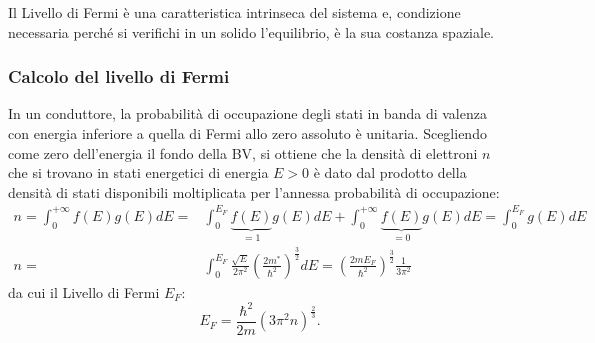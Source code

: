 \documentclass[a4paper,11pt]{report}
\begin{document}
\noindent
Il Livello di Fermi è una caratteristica intrinseca del sistema e, condizione necessaria perché si verifichi in un solido l'equilibrio, è la sua costanza spaziale. 

\subsubsection{Calcolo del livello di Fermi}
In un conduttore, la probabilità di occupazione degli stati in banda di valenza con energia inferiore a quella di Fermi allo zero assoluto è unitaria. Scegliendo come zero dell'energia il fondo della BV, si ottiene che la densità di elettroni $n$ che si trovano in stati energetici di energia $E>0$ è dato dal prodotto della densità di stati disponibili moltiplicata per l'annessa probabilità di occupazione:
\begin{equation}
\begin{aligned}
n = \int_0^{+\infty} f(E)g(E)dE =& \int_0^{E_F} \underbrace{f(E)}_{=1}g(E)dE + \int_0^{+\infty} \underbrace{f(E)}_{=0}g(E)dE = \int_0^{E_F}g(E)dE \\
n =& \int_0^{E_F} \frac{\sqrt{E}}{2\pi^2}\left(\frac{2m^*}{\hbar^2}\right)^{\frac{3}{2}} dE = \left(\frac{2mE_F}{\hbar^2}\right)^{\frac{3}{2}}\frac{1}{3\pi^2} 
\end{aligned}
\end{equation}
da cui il Livello di Fermi $E_F$:
\begin{equation}
E_F = \frac{\hbar^2}{2m}(3\pi^2n)^{\frac{2}{3}}.
\end{equation}
\end{document}
